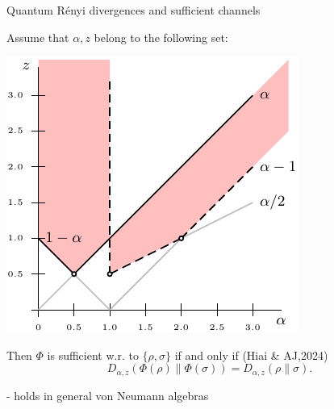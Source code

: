 \documentclass[mathserif]{beamer}
\newcommand{\<}{\langle}
\renewcommand{\>}{\rangle}
\begin{document}
\begin{frame}{Quantum R\'enyi divergences and sufficient channels}

Assume that $\alpha,z$ belong to the following set: 

\includegraphics[scale=0.9]{obr_anna.pdf}

%
%
%
Then $\Phi$ is sufficient w.r. to $\{\rho,\sigma\}$ if and only if  {\small (Hiai \&
AJ,2024)}
\[
D_{\alpha,z}(\Phi(\rho)\|\Phi(\sigma))=D_{\alpha,z}(\rho\|\sigma).
\]


- holds in general von Neumann algebras

\end{frame}
\end{document}
